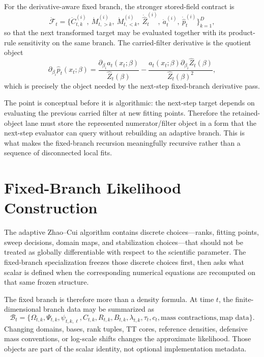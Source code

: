 For the derivative-aware fixed branch, the stronger stored-field contract is
\begin{equation}
  \dot{\mathcal F}_t=
  \{\dot C_{t,k}^{(i)},\ \dot M_{t,>k}^{(i)},\ \dot M_{t,<k}^{(i)},\
    \dot{\widehat Z}_t^{(i)},\ \dot a_t^{(i)},\ \dot{\widehat p}_t^{(i)}\}_{k=1}^{D},
  \label{eq:bf-hd-squared-tt-stored-derivative}
\end{equation}
so that the next transformed target may be evaluated together with its product-rule
sensitivity on the same branch.  The carried-filter derivative is the quotient
object
\begin{equation}
  \partial_{\beta_i}\widehat p_t(x_t;\beta)
  =
  \frac{\partial_{\beta_i}a_t(x_t;\beta)}{\widehat Z_t(\beta)}
  -
  \frac{a_t(x_t;\beta)\partial_{\beta_i}\widehat Z_t(\beta)}{\widehat Z_t(\beta)^2},
  \label{eq:bf-hd-squared-tt-carried-derivative}
\end{equation}
which is precisely the object needed by the next-step fixed-branch derivative
pass.

The point is conceptual before it is algorithmic: the next-step target depends
on evaluating the previous carried filter at new fitting points.  Therefore the
retained-object lane must store the represented numerator/filter object in a form
that the next-step evaluator can query without rebuilding an adaptive branch.
This is what makes the fixed-branch recursion meaningfully recursive rather than a
sequence of disconnected local fits.

\section{Fixed-Branch Likelihood Construction}
\label{sec:bf-hd-squared-tt-fixed-branch-likelihood}

The adaptive Zhao--Cui algorithm contains discrete choices---ranks, fitting
points, sweep decisions, domain maps, and stabilization choices---that should not
be treated as globally differentiable with respect to the scientific parameter.
The fixed-branch specialization freezes those discrete choices first, then asks
what scalar is defined when the corresponding numerical equations are recomputed
on that same frozen structure.

The fixed branch is therefore more than a density formula.  At time \(t\), the
finite-dimensional branch data may be summarized as
\begin{equation}
  \mathcal B_t=
  \{\Omega_{t,k},\Psi_{t,k},\psi_{t,k,\ell},C_{t,k},R_{t,k},B_{t,k},
    \lambda_{t,k},\tau_t,c_t,\text{mass contractions},\text{map data}\}.
  \label{eq:bf-hd-squared-tt-branch-data}
\end{equation}
Changing domains, bases, rank tuples, TT cores, reference densities, defensive
mass conventions, or log-scale shifts changes the approximate likelihood.  Those
objects are part of the scalar identity, not optional implementation metadata.

